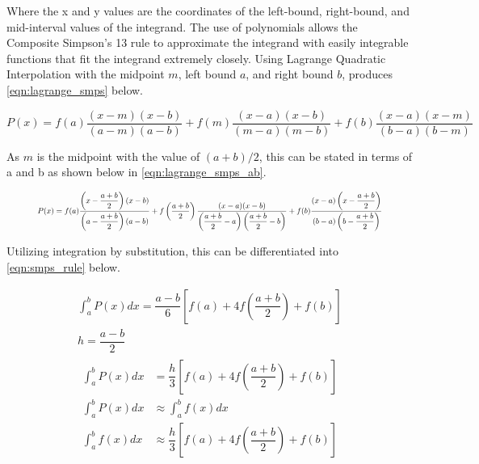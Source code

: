 \documentclass{paper}
\begin{document}
Where the x and y values are the coordinates of the left-bound, right-bound, and mid-interval values of the integrand.
The use of polynomials allows the Composite Simpson's 13 rule to approximate the integrand with easily integrable functions that fit the integrand extremely closely.
Using Lagrange Quadratic Interpolation with the midpoint \(m\), left bound \(a\), and right bound \(b\), produces \eqref{eqn:lagrange_smps} below.

\begin{equation}
    \label{eqn:lagrange_smps}
    P(x) = f(a) \dfrac{(x - m)(x - b)}{(a - m)(a - b)} + f(m) \dfrac{(x - a)(x - b)}{(m - a)(m - b)} + f(b) \dfrac{(x - a)(x - m)}{(b - a)(b - m)}
\end{equation}

As \(m\) is the midpoint with the value of \((a + b) / 2\), this can be stated in terms of a and b as shown below in \eqref{eqn:lagrange_smps_ab}.

\begin{equation}
    \label{eqn:lagrange_smps_ab}
    \resizebox{.9\textwidth}{!} 
    {
    $P(x) = f(a) \dfrac{\left(x - \dfrac{a+b}{2}\right)(x - b)}{\left(a - \dfrac{a+b}{2}\right)(a - b)} + f\left(\dfrac{a+b}{2}\right) \dfrac{(x - a)(x - b)}{\left(\dfrac{a+b}{2} - a\right)\left(\dfrac{a+b}{2} - b\right)} + f(b) \dfrac{(x - a)\left(x - \dfrac{a+b}{2}\right)}{(b - a)\left(b - \dfrac{a+b}{2}\right)}$
    }
\end{equation}

Utilizing integration by substitution, this can be differentiated into \eqref{eqn:smps_rule} below.

\begin{equation}
    \label{eqn:smps_rule}
    \begin{gathered}
    \int_a^b P(x) dx = \dfrac{a - b}{6} \left[f(a) + 4f\left(\dfrac{a + b}{2}\right) + f(b)\right]          \\
    h = \dfrac{a - b}{2}                                                                                    \\
    \begin{aligned}
        \int_a^b P(x) dx &= \dfrac{h}{3} \left[f(a) + 4f\left(\dfrac{a + b}{2}\right) + f(b)\right]         \\
        \int_a^b P(x) dx &\approx \int_a^b f(x) dx                                                          \\
        \int_a^b f(x) dx &\approx \dfrac{h}{3} \left[f(a) + 4f\left(\dfrac{a + b}{2}\right) + f(b)\right]   \\
    \end{aligned}
\end{gathered}
\end{equation}
\end{document}
